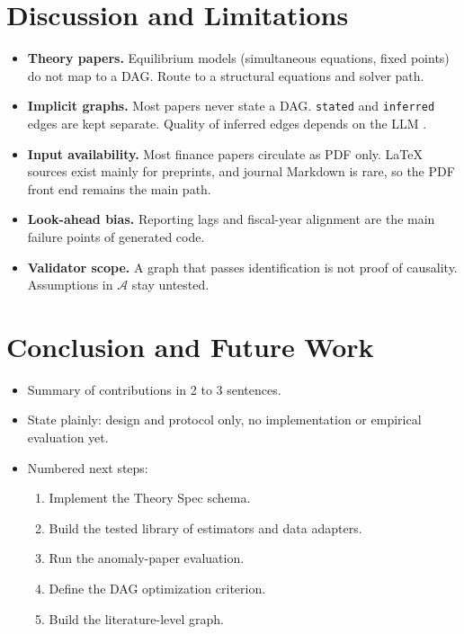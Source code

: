   \section{Discussion and Limitations}\label{sec:limitations}

  \begin{itemize}
  \tightlist
  \item
    \textbf{Theory papers.} Equilibrium models (simultaneous equations,
    fixed points) do not map to a DAG. Route to a structural equations and
    solver path.
  \item
    \textbf{Implicit graphs.} Most papers never state a DAG.
    \texttt{stated} and \texttt{inferred} edges are kept separate. Quality
    of inferred edges depends on the LLM
    \cite{jin2023corr2cause,zecevic2023causal,saklad2025recite}.
  \item
    \textbf{Input availability.} Most finance papers circulate as PDF
    only. LaTeX sources exist mainly for preprints, and journal Markdown
    is rare, so the PDF front end remains the main path.
  \item
    \textbf{Look-ahead bias.} Reporting lags and fiscal-year alignment
    are the main failure points of generated code.
  \item
    \textbf{Validator scope.} A graph that passes identification is not
    proof of causality. Assumptions in \(\mathcal{A}\) stay untested.
  \end{itemize}

  \section{Conclusion and Future Work}\label{sec:conclusion}

  \begin{itemize}
  \tightlist
  \item
    Summary of contributions in 2 to 3 sentences.
  \item
    State plainly: design and protocol only, no implementation or
    empirical evaluation yet.
  \item
    Numbered next steps:

    \begin{enumerate}
    \def\labelenumi{\arabic{enumi}.}
    \tightlist
    \item
      Implement the Theory Spec schema.
    \item
      Build the tested library of estimators and data adapters.
    \item
      Run the anomaly-paper evaluation.
    \item
      Define the DAG optimization criterion.
    \item
      Build the literature-level graph.
    \end{enumerate}
  \end{itemize}

  
  

